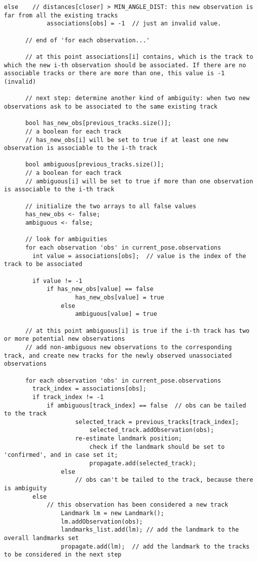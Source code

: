 {\begin{lstlisting}[frame=shadowbox,breaklines]
        else	// distances[closer] > MIN_ANGLE_DIST: this new observation is far from all the existing tracks
        	associations[obs] = -1	// just an invalid value.
      
      // end of 'for each observation...'
      
      // at this point associations[i] contains, which is the track to which the new i-th observation should be associated. If there are no associable tracks or there are more than one, this value is -1 (invalid)
      
      // next step: determine another kind of ambiguity: when two new observations ask to be associated to the same existing track
      
      bool has_new_obs[previous_tracks.size()];
      // a boolean for each track
      // has_new_obs[i] will be set to true if at least one new observation is associable to the i-th track
      
      bool ambiguous[previous_tracks.size()];
      // a boolean for each track
      // ambiguous[i] will be set to true if more than one observation is associable to the i-th track
      
      // initialize the two arrays to all false values
      has_new_obs <- false;
      ambiguous <- false;
      
      // look for ambiguities
      for each observation 'obs' in current_pose.observations
      	int value = associations[obs];	// value is the index of the track to be associated
        
        if value != -1
        	if has_new_obs[value] == false
                	has_new_obs[value] = true
                else
                	ambiguous[value] = true
                        
      // at this point ambiguous[i] is true if the i-th track has two or more potential new observations
      // add non-ambiguous new observations to the corresponding track, and create new tracks for the newly observed unassociated observations
      
      for each observation 'obs' in current_pose.observations
      	track_index = associations[obs];
      	if track_index != -1
        	if ambiguous[track_index] == false	// obs can be tailed to the track
        	        selected_track = previous_tracks[track_index];
                        selected_track.addObservation(obs);
                	re-estimate landmark position;
                        check if the landmark should be set to 'confirmed', and in case set it;
                        propagate.add(selected_track);
                else
                	// obs can't be tailed to the track, because there is ambiguity
        else
        	// this observation has been considered a new track
                Landmark lm = new Landmark();
                lm.addObservation(obs);
                landmarks_list.add(lm);	// add the landmark to the overall landmarks set
                propagate.add(lm);	// add the landmark to the tracks to be considered in the next step
    

\end{lstlisting}}
